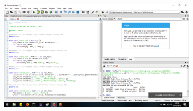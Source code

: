 \begin{figure}[H]
	\includegraphics[width=10cm]{figures/diva/Chapter4/kode_teori2.png}
	\centering
\end{figure}
